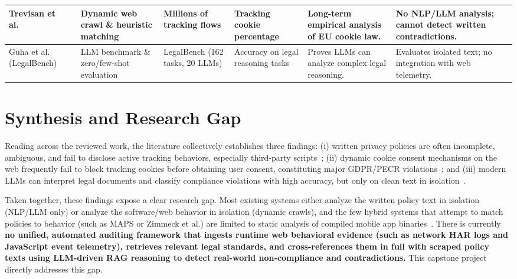 \documentclass[11pt,a4paper]{article}
\begin{document}
\begin{table}[h]
\begin{tabular}{p{2.3cm}p{2.3cm}p{2.2cm}p{2.3cm}p{3cm}p{3.2cm}}
\hline
Trevisan et al.~\cite{trevisan-2019-cookielaw} & Dynamic web crawl \& heuristic matching & Millions of tracking flows & Tracking cookie percentage & Long-term empirical analysis of EU cookie law. & No NLP/LLM analysis; cannot detect written contradictions. \\
\hline
Guha et al. (LegalBench)~\cite{guha-2023-legalbench} & LLM benchmark \& zero/few-shot evaluation & LegalBench (162 tasks, 20 LLMs) & Accuracy on legal reasoning tasks & Proves LLMs can analyze complex legal reasoning. & Evaluates isolated text; no integration with web telemetry. \\
\hline
\end{tabular}
\end{table}

\section{Synthesis and Research Gap}
Reading across the reviewed work, the literature collectively establishes three findings: (i) written privacy policies are often incomplete, ambiguous, and fail to disclose active tracking behaviors, especially third-party scripts~\cite{wilson-2016-opp115,harkous-2018-polisis,ravichander-2019-privacyqa}; (ii) dynamic cookie consent mechanisms on the web frequently fail to block tracking cookies before obtaining user consent, constituting major GDPR/PECR violations~\cite{trevisan-2019-cookielaw,bouhoula-2024-cookies}; and (iii) modern LLMs can interpret legal documents and classify compliance violations with high accuracy, but only on clean text in isolation~\cite{guha-2023-legalbench,xie-2025-llmpolicy}.

Taken together, these findings expose a clear research gap. Most existing systems either analyze the written policy text in isolation (NLP/LLM only) or analyze the software/web behavior in isolation (dynamic crawls), and the few hybrid systems that attempt to match policies to behavior (such as MAPS or Zimmeck et al.) are limited to static analysis of compiled mobile app binaries~\cite{zimmeck-2017-mobileapps,zimmeck-2019-maps,xiao-2023-lalaine}. There is currently \textbf{no unified, automated auditing framework that ingests runtime web behavioral evidence (such as network HAR logs and JavaScript event telemetry), retrieves relevant legal standards, and cross-references them in full with scraped policy texts using LLM-driven RAG reasoning to detect real-world non-compliance and contradictions.} This capstone project directly addresses this gap.
\end{document}
